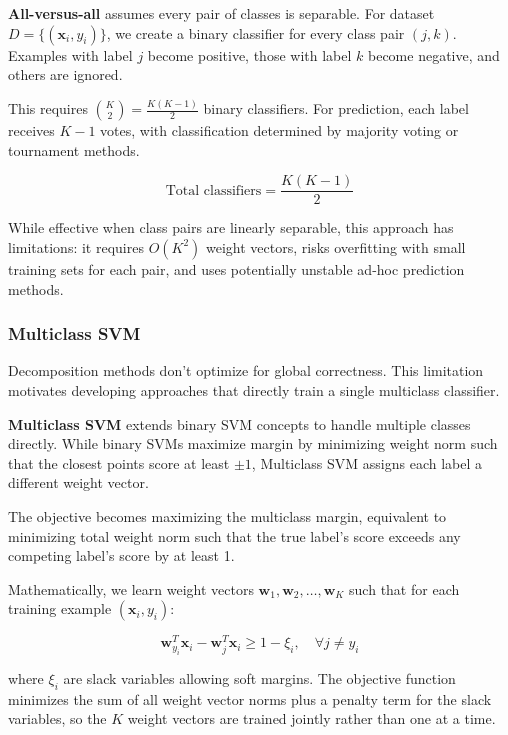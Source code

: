 \textbf{All-versus-all} assumes every pair of classes is separable. For dataset $D = \{(\mathbf{x}_i, y_i)\}$, we create a binary classifier for every class pair $(j, k)$. Examples with label $j$ become positive, those with label $k$ become negative, and others are ignored.

This requires $\binom{K}{2} = \frac{K(K-1)}{2}$ binary classifiers. For prediction, each label receives $K-1$ votes, with classification determined by majority voting or tournament methods.

\begin{equation}
\text{Total classifiers} = \frac{K(K-1)}{2}
\end{equation}

While effective when class pairs are linearly separable, this approach has limitations: it requires $O(K^2)$ weight vectors, risks overfitting with small training sets for each pair, and uses potentially unstable ad-hoc prediction methods.

\subsubsection{Multiclass SVM}
Decomposition methods don't optimize for global correctness. This limitation motivates developing approaches that directly train a single multiclass classifier.

\textbf{Multiclass SVM} extends binary SVM concepts to handle multiple classes directly. While binary SVMs maximize margin by minimizing weight norm such that the closest points score at least $\pm 1$, Multiclass SVM assigns each label a different weight vector.

The objective becomes maximizing the multiclass margin, equivalent to minimizing total weight norm such that the true label's score exceeds any competing label's score by at least 1.

Mathematically, we learn weight vectors $\mathbf{w}_1, \mathbf{w}_2, \ldots, \mathbf{w}_K$ such that for each training example $(\mathbf{x}_i, y_i)$:

\begin{equation}
\mathbf{w}_{y_i}^T\mathbf{x}_i - \mathbf{w}_j^T\mathbf{x}_i \geq 1 - \xi_i, \quad \forall j \neq y_i
\end{equation}

where $\xi_i$ are slack variables allowing soft margins. The objective function minimizes the sum of all weight vector norms plus a penalty term for the slack variables, so the $K$ weight vectors are trained jointly rather than one at a time.

